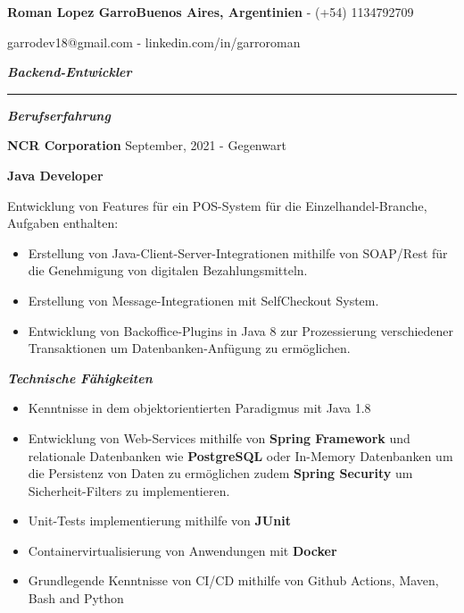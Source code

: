 \documentclass{article}
\begin{document}
\fontsize{18pt}{0pt}
\noindent\textbf{Roman Lopez Garro}\hfill\fontsize{10pt}{0pt}\textbf{Buenos Aires, Argentinien} - (+54) 1134792709

\hfill garrodev18@gmail.com - linkedin.com/in/garroroman

\vspace{1mm}

\fontsize{13pt}{0pt}
\noindent\textit{\textbf{Backend-Entwickler}}
\par\noindent\rule{\textwidth}{0.4pt}

\vspace{4mm}
\fontsize{12pt}{0pt}
\begin{center}
    \textit{\textbf{Berufserfahrung}}
\end{center}

\vspace{1mm}
\setlength{\parindent}{11pt}\fontsize{10pt}{0pt}\textbf{NCR Corporation} \hfill September, 2021 - Gegenwart

\vspace{1mm}
\setlength{\parindent}{11pt}\fontsize{10pt}{0pt}\textbf{Java Developer}

\vspace{4mm}
\indent Entwicklung von Features für ein POS-System für die Einzelhandel-Branche, Aufgaben enthalten:
\begin{itemize}
    \item Erstellung von Java-Client-Server-Integrationen mithilfe von SOAP/Rest für die Genehmigung von digitalen Bezahlungsmitteln.
    \item Erstellung von Message-Integrationen mit SelfCheckout System.
    \item Entwicklung von Backoffice-Plugins in Java 8 zur Prozessierung verschiedener Transaktionen um Datenbanken-Anfügung zu ermöglichen.

\end{itemize}

\vspace{4mm}
\fontsize{12pt}{0pt}
\begin{center}
    \textit{\textbf{Technische Fähigkeiten}}
\end{center}

\fontsize{9pt}{0pt}
\noindent
\begin{itemize}
    \item Kenntnisse in dem objektorientierten Paradigmus mit Java 1.8
    \item Entwicklung von Web-Services mithilfe von \textbf{Spring Framework} und relationale Datenbanken wie \textbf{PostgreSQL} oder In-Memory Datenbanken um die Persistenz von Daten zu ermöglichen zudem \textbf{Spring Security} um Sicherheit-Filters zu implementieren.
    \item Unit-Tests implementierung mithilfe von \textbf{JUnit}
    \item Containervirtualisierung von Anwendungen mit \textbf{Docker}
    \item Grundlegende Kenntnisse von CI/CD mithilfe von Github Actions, Maven, Bash and Python
\end{itemize}
\end{document}
